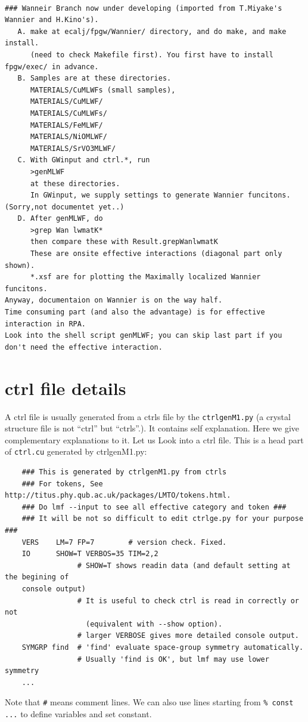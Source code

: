 \documentclass[a4paper,10pt,epsf,fleqn]{article}
\begin{document}
{\begin{verbatim}

### Wanneir Branch now under developing (imported from T.Miyake's Wannier and H.Kino's).
   A. make at ecalj/fpgw/Wannier/ directory, and do make, and make install. 
      (need to check Makefile first). You first have to install fpgw/exec/ in advance.
   B. Samples are at these directories. 
      MATERIALS/CuMLWFs (small samples),
      MATERIALS/CuMLWF/
      MATERIALS/CuMLWFs/
      MATERIALS/FeMLWF/      
      MATERIALS/NiOMLWF/
      MATERIALS/SrVO3MLWF/
   C. With GWinput and ctrl.*, run 
      >genMLWF
      at these directories.
      In GWinput, we supply settings to generate Wannier funcitons. (Sorry,not documentet yet..)
   D. After genMLWF, do
      >grep Wan lwmatK*
      then compare these with Result.grepWanlwmatK
      These are onsite effective interactions (diagonal part only shown).
      *.xsf are for plotting the Maximally localized Wannier funcitons.
Anyway, documentaion on Wannier is on the way half.
Time consuming part (and also the advantage) is for effective interaction in RPA.
Look into the shell script genMLWF; you can skip last part if you don't need the effective interaction.

\end{verbatim}


\section{ctrl file details}
A ctrl file is usually generated from a ctrls file by the \verb+ctrlgenM1.py+
(a crystal structure file is not ``ctrl'' but ``ctrls''.).
It contains self explanation.
Here we give complementary explanations to it.
Let us Look into a ctrl file. This is a head part of \verb+ctrl.cu+ generated by ctrlgenM1.py:
\begin{verbatim}
    ### This is generated by ctrlgenM1.py from ctrls 
    ### For tokens, See http://titus.phy.qub.ac.uk/packages/LMTO/tokens.html. 
    ### Do lmf --input to see all effective category and token ###
    ### It will be not so difficult to edit ctrlge.py for your purpose ###
    VERS    LM=7 FP=7        # version check. Fixed.
    IO      SHOW=T VERBOS=35 TIM=2,2
                 # SHOW=T shows readin data (and default setting at the begining of 
    console output)
                 # It is useful to check ctrl is read in correctly or not
                   (equivalent with --show option).
                 # larger VERBOSE gives more detailed console output.
    SYMGRP find  # 'find' evaluate space-group symmetry automatically.
                 # Usually 'find is OK', but lmf may use lower symmetry
    ...
\end{verbatim}
Note that \verb+#+ means comment lines. We can also use
lines starting from \verb+% const ...+ to define variables and set constant.

}
\end{document}
